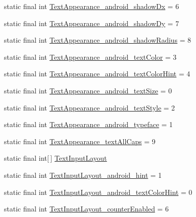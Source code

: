 \begin{CompactItemize}
\item 
static final int \hyperlink{classandroid_1_1support_1_1v4_1_1_r_1_1styleable_caca2f26badd9c92b5b0111fb4411167}{TextAppearance\_\-android\_\-shadowDx} = 6
\item 
static final int \hyperlink{classandroid_1_1support_1_1v4_1_1_r_1_1styleable_df8c466194468431db1ca727606ba7db}{TextAppearance\_\-android\_\-shadowDy} = 7
\item 
static final int \hyperlink{classandroid_1_1support_1_1v4_1_1_r_1_1styleable_843e7e567e8b26d9c44db983122edc52}{TextAppearance\_\-android\_\-shadowRadius} = 8
\item 
static final int \hyperlink{classandroid_1_1support_1_1v4_1_1_r_1_1styleable_0763260e2c7644b0c1ff2a7c911c03af}{TextAppearance\_\-android\_\-textColor} = 3
\item 
static final int \hyperlink{classandroid_1_1support_1_1v4_1_1_r_1_1styleable_13b2c5daf5c13f138a2f6590d38a3f8c}{TextAppearance\_\-android\_\-textColorHint} = 4
\item 
static final int \hyperlink{classandroid_1_1support_1_1v4_1_1_r_1_1styleable_0ef17f89c7c229543a6ba3224cc45bde}{TextAppearance\_\-android\_\-textSize} = 0
\item 
static final int \hyperlink{classandroid_1_1support_1_1v4_1_1_r_1_1styleable_0613c7992a55173fc1d4760327545d8a}{TextAppearance\_\-android\_\-textStyle} = 2
\item 
static final int \hyperlink{classandroid_1_1support_1_1v4_1_1_r_1_1styleable_6c3c73a9cbb806db9a963cfd57cf2040}{TextAppearance\_\-android\_\-typeface} = 1
\item 
static final int \hyperlink{classandroid_1_1support_1_1v4_1_1_r_1_1styleable_d6fbed48414bfa4d49f846b006cb67af}{TextAppearance\_\-textAllCaps} = 9
\item 
static final int\mbox{[}$\,$\mbox{]} \hyperlink{classandroid_1_1support_1_1v4_1_1_r_1_1styleable_880beb171ce483ab1b63a82ef7f9d976}{TextInputLayout}
\item 
static final int \hyperlink{classandroid_1_1support_1_1v4_1_1_r_1_1styleable_2296977f7a733d53ec47e700d4130151}{TextInputLayout\_\-android\_\-hint} = 1
\item 
static final int \hyperlink{classandroid_1_1support_1_1v4_1_1_r_1_1styleable_1e92f2247843ef875eda6c3045e73bbd}{TextInputLayout\_\-android\_\-textColorHint} = 0
\item 
static final int \hyperlink{classandroid_1_1support_1_1v4_1_1_r_1_1styleable_93a894bdcf077508cc30b9d7bfa9662d}{TextInputLayout\_\-counterEnabled} = 6

\end{CompactItemize}
